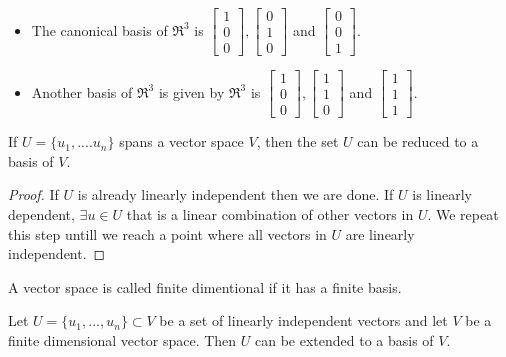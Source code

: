\begin{itemize}
	\item The canonical basis of $\Re^3$ is  $\begin{bmatrix} 	1 \\ 0 \\ 0 \end{bmatrix}, \begin{bmatrix} 	0 \\ 1 \\ 0 \end{bmatrix}$ and $\begin{bmatrix} 0 \\ 0 \\ 1 \end{bmatrix}$.
	\item Another basis of $\Re^3$ is given by $\Re^3$ is  $\begin{bmatrix} 	1 \\ 0 \\ 0 \end{bmatrix}, \begin{bmatrix} 	1 \\ 1 \\ 0 \end{bmatrix}$ and $\begin{bmatrix} 1 \\ 1 \\ 1 \end{bmatrix}$. \\
\end{itemize}

\begin{proposition}
	If $U = \{u_1,....u_n\}$ spans a vector space $V$, then the set $U$ can be reduced to a basis of $V$.
\end{proposition}

\begin{proof}
	If $U$ is already linearly independent then we are done. If $U$ is linearly dependent, $ \exists u \in U$ that is a linear combination of other vectors in $U$. We repeat this step untill we reach a point where all vectors in $U$ are linearly independent. 
\end{proof}

\begin{definition}
	A vector space is called finite dimentional if it has a finite basis.
\end{definition}

\begin{proposition}
	Let $U = \{u_1,...,u_n\} \subset V$ be a set of linearly independent vectors and let $V$ be a finite dimensional vector space. Then $U$ can be extended to a basis of $V$. 
\end{proposition}

